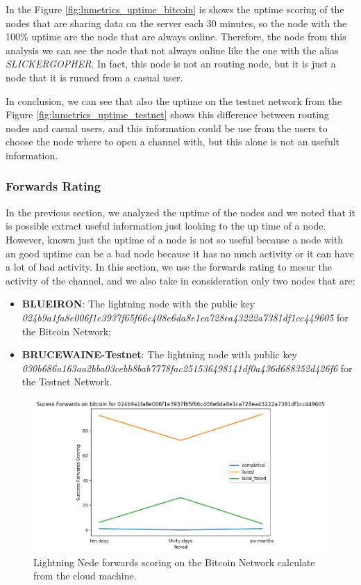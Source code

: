 In the Figure \ref{fig:lnmetrics_uptime_bitcoin} is shows the uptime scoring of the nodes that 
are sharing data on the server each 30 minutes, so the node with the 100\% uptime 
are the node that are always online. Therefore, the node from this analysis we can 
see the node that not always online like the one with the alias \emph{SLICKERGOPHER}. In fact, 
this node is not an routing node, but it is just a node that it is runned from a casual user.

In conclusion, we can see that also the uptime on the testnet network from the Figure \ref{fig:lnmetrics_uptime_testnet}
shows this difference between routing nodes and casual users, and this information could be use 
from the users to choose the node where to open a channel with, but this alone is not an usefult information.

\subsubsection{Forwards Rating}

In the previous section, we analyzed the uptime of the nodes and we noted that it is possible 
extract useful information just looking to the up time of a node. However, known just the 
uptime of a node is not so useful because a node with an good uptime can be a bad node because 
it has no much activity or it can have a lot of bad activity. 
In this section, we use the forwards rating to mesur the activity of the channel, and we also
take in consideration only two nodes that are: 

\begin{itemize}
    \item {\bf BLUEIRON}: The lightning node with the public key \emph{024b9a1fa8e006f1e3937f65f66c408e6da8e1ca728ea43222a7381df1cc449605} for the Bitcoin Network;
    \item {\bf BRUCEWAINE-Testnet}: The lightning node with public key \emph{030b686a163aa2bba03cebb8bab7778fac251536498141df0a436d688352d426f6} for the Testnet Network.
\end{itemize}

\begin{figure}
    \begin{center}
      \includegraphics[scale=0.7]{imgs/bitcoin_forwards.png}
    \end{center}
    \caption{Lightning Nede forwards scoring on the Bitcoin Network calculate from the cloud machine.}
    \label{fig:lnmetrics_forwards_bitcoin}
\end{figure}


